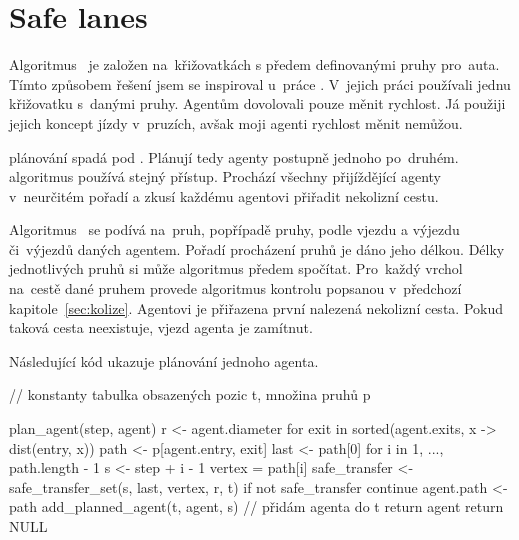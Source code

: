 \section{Safe lanes}\label{sec:safe_lanes}



Algoritmus~ je založen na~křižovatkách s předem definovanými pruhy pro~auta.
Tímto způsobem řešení jsem se inspiroval u~práce \citet{Dresner}.
V~jejich práci používali jednu křižovatku s~danými pruhy.
Agentům dovolovali pouze měnit rychlost.
Já použiji jejich koncept jízdy v~pruzích, avšak moji agenti rychlost měnit nemůžou.

\citet{Dresner} plánování spadá pod .
Plánují tedy agenty postupně jednoho po~druhém.
 algoritmus používá stejný přístup.
Prochází všechny přijíždějící agenty v~neurčitém pořadí a zkusí každému agentovi přiřadit nekolizní cestu.

Algoritmus~ se podívá na~pruh, popřípadě pruhy, podle vjezdu a výjezdu či~výjezdů daných agentem.
Pořadí procházení pruhů je dáno jeho délkou.
Délky jednotlivých pruhů si může algoritmus předem spočítat.
Pro~každý vrchol na~cestě dané pruhem provede algoritmus kontrolu popsanou v~předchozí kapitole~\ref{sec:kolize}.
Agentovi je přiřazena první nalezená nekolizní cesta.
Pokud taková cesta neexistuje, vjezd agenta je zamítnut.

Následující kód ukazuje plánování jednoho agenta.
\begin{code}
// konstanty tabulka obsazených pozic t, množina pruhů p

plan_agent(step, agent)
  r <- agent.diameter
  for exit in sorted(agent.exits, x -> dist(entry, x))
    path <- p[agent.entry, exit]
    last <- path[0]
    for i in 1, ..., path.length - 1
      s <- step + i - 1
      vertex = path[i]
      safe_transfer <- safe_transfer_set(s, last, vertex, r, t)
      if not safe_transfer
        continue
    agent.path <- path
    add_planned_agent(t, agent, s)  // přidám agenta do t
    return agent
  return NULL
\end{code}
